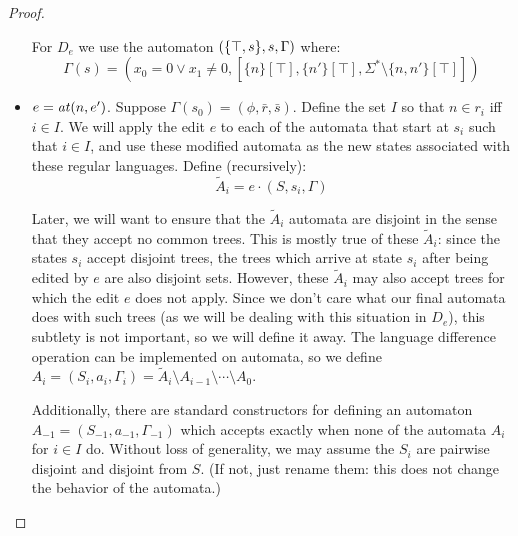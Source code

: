 \begin{proof}
\begin{itemize}
For $D_e$ we use the automaton $(\{\top,s\},s,\Gamma)$ where:
\[\Gamma(s) = (x_0=0 \lor x_1\ne0,[\{n\}[\top],\{n'\}[\top],\Sigma^*\setminus\{n,n'\}[\top]])\]

\item $e=\mathit{at}(n,e')$. Suppose $\Gamma(s_0)=(\phi,\bar r,\bar s)$. Define the
set $I$ so that $n \in r_i$ iff $i \in I$. We will apply the edit $e$
to each of the automata that start at $s_i$ such that $i \in I$, and use
these modified automata as the new states associated with these regular
languages.
Define (recursively):
\[\tilde A_i = e \cdot (S,s_i,\Gamma)\]

Later, we will want to ensure that the $\tilde A_i$ automata are disjoint in the
sense that they accept no common trees. This is mostly true of these $\tilde
A_i$:
since the states $s_i$ accept disjoint trees, the trees which arrive at
state $s_i$ after being edited by $e$ are also disjoint sets. However, these
$\tilde A_i$ may also accept trees for which the edit $e$ does not apply. Since we
don't care what our final automata does with such trees (as we will be
dealing with this situation in $D_e$), this subtlety is not important, so we
will define it away. The language difference operation can be implemented on
automata, so we define $A_i=(S_i,a_i,\Gamma_i)=\tilde A_i \setminus A_{i-1}
\setminus \cdots \setminus A_0$.

Additionally, there are standard constructors for defining an automaton
$A_{-1}=(S_{-1},a_{-1},\Gamma_{-1})$ which accepts exactly when none of the
automata $A_i$ for $i \in I$ do.
%
Without loss of generality, we may assume the $S_i$ are pairwise disjoint
and disjoint from $S$. (If not, just rename them: this does not change the
behavior of the automata.)


\end{itemize}
\end{proof}
